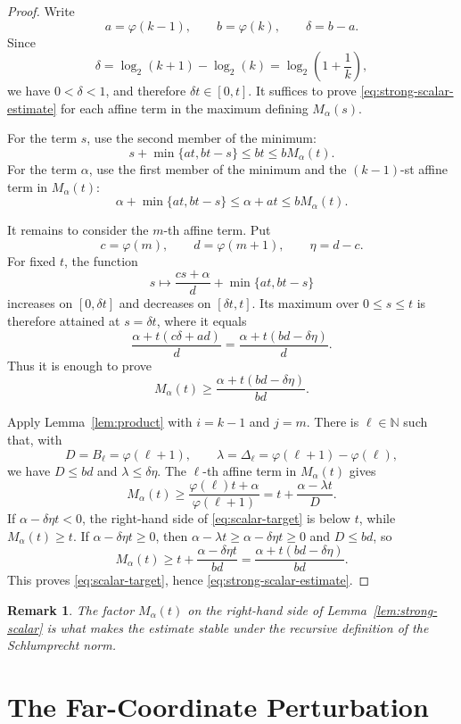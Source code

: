 \documentclass[11pt]{article}
\newtheorem{remark}[theorem]{Remark}
\newcommand{\N}{\mathbb N}
\newcommand{\ph}{\varphi}
\begin{document}
\begin{proof}
Write
\[
 a=\ph(k-1),\qquad b=\ph(k),\qquad \delta=b-a.
\]
Since
\[
 \delta=\log_2(k+1)-\log_2(k)=\log_2\left(1+\frac1k\right),
\]
we have $0<\delta<1$, and therefore $\delta t\in[0,t]$.  It suffices
to prove \eqref{eq:strong-scalar-estimate} for each affine term in the
maximum defining $M_\alpha(s)$.

For the term $s$, use the second member of the minimum:
\[
 s+\min\{at,bt-s\}\le bt\le bM_\alpha(t).
\]
For the term $\alpha$, use the first member of the minimum and the
$(k-1)$-st affine term in $M_\alpha(t)$:
\[
 \alpha+\min\{at,bt-s\}\le \alpha+at\le bM_\alpha(t).
\]

It remains to consider the $m$-th affine term.  Put
\[
 c=\ph(m),\qquad d=\ph(m+1),\qquad \eta=d-c.
\]
For fixed $t$, the function
\[
 s\mapsto \frac{cs+\alpha}{d}+\min\{at,bt-s\}
\]
increases on $[0,\delta t]$ and decreases on $[\delta t,t]$.  Its maximum
over $0\le s\le t$ is therefore attained at $s=\delta t$, where it equals
\[
 \frac{\alpha+t(c\delta+ad)}{d}
 =
 \frac{\alpha+t(bd-\delta\eta)}{d}.
\]
Thus it is enough to prove
\begin{equation}
 M_\alpha(t)\ge
 \frac{\alpha+t(bd-\delta\eta)}{bd}.
 \label{eq:scalar-target}
\end{equation}

Apply Lemma~\ref{lem:product} with $i=k-1$ and $j=m$.  There is
$\ell\in\N$ such that, with
\[
 D=B_\ell=\ph(\ell+1),
 \qquad
 \lambda=\Delta_\ell=\ph(\ell+1)-\ph(\ell),
\]
we have $D\le bd$ and $\lambda\le \delta\eta$.  The $\ell$-th affine term
in $M_\alpha(t)$ gives
\[
 M_\alpha(t)
 \ge
 \frac{\ph(\ell)t+\alpha}{\ph(\ell+1)}
 =
 t+\frac{\alpha-\lambda t}{D}.
\]
If $\alpha-\delta\eta t<0$, the right-hand side of
\eqref{eq:scalar-target} is below $t$, while $M_\alpha(t)\ge t$.  If
$\alpha-\delta\eta t\ge 0$, then
$\alpha-\lambda t\ge\alpha-\delta\eta t\ge 0$ and $D\le bd$, so
\[
 M_\alpha(t)
 \ge
 t+\frac{\alpha-\delta\eta t}{bd}
 =
 \frac{\alpha+t(bd-\delta\eta)}{bd}.
\]
This proves \eqref{eq:scalar-target}, hence
\eqref{eq:strong-scalar-estimate}.
\end{proof}

\begin{remark}
The factor $M_\alpha(t)$ on the right-hand side of
Lemma~\ref{lem:strong-scalar} is what makes the estimate stable under the
recursive definition of the Schlumprecht norm.
\end{remark}

\section{The Far-Coordinate Perturbation}
\end{document}
